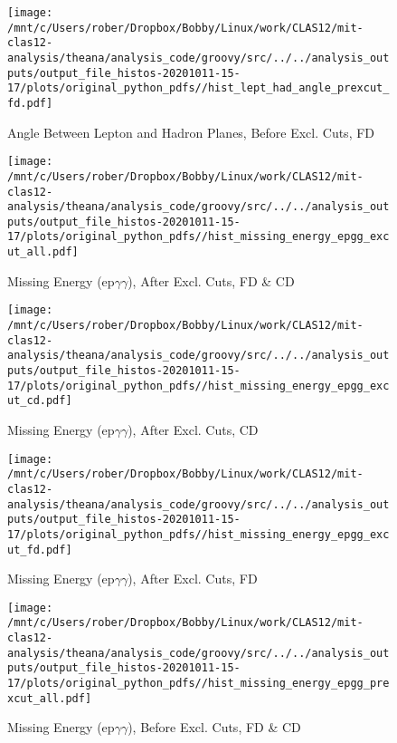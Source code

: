\documentclass{article}
\begin{document}
\begin{landscape}
\begin{figure}[h]
        \texttt{[image: /mnt/c/Users/rober/Dropbox/Bobby/Linux/work/CLAS12/mit-clas12-analysis/theana/analysis\_code/groovy/src/../../analysis\_outputs/output\_file\_histos-20201011-15-17/plots/original\_python\_pdfs//hist\_lept\_had\_angle\_prexcut\_fd.pdf]}
        \captionsetup{textformat=empty,labelformat=blank}
        \caption{Angle Between Lepton and Hadron Planes, Before Excl. Cuts, FD}
    \end{figure}
    \clearpage
    
    \begin{figure}[h]
        \centering

        \texttt{[image: /mnt/c/Users/rober/Dropbox/Bobby/Linux/work/CLAS12/mit-clas12-analysis/theana/analysis\_code/groovy/src/../../analysis\_outputs/output\_file\_histos-20201011-15-17/plots/original\_python\_pdfs//hist\_missing\_energy\_epgg\_excut\_all.pdf]}
        \captionsetup{textformat=empty,labelformat=blank}
        \caption{Missing Energy (ep$\gamma$$\gamma$), After Excl. Cuts, FD \& CD}
    \end{figure}
    \clearpage
    
    \begin{figure}[h]
        \centering

        \texttt{[image: /mnt/c/Users/rober/Dropbox/Bobby/Linux/work/CLAS12/mit-clas12-analysis/theana/analysis\_code/groovy/src/../../analysis\_outputs/output\_file\_histos-20201011-15-17/plots/original\_python\_pdfs//hist\_missing\_energy\_epgg\_excut\_cd.pdf]}
        \captionsetup{textformat=empty,labelformat=blank}
        \caption{Missing Energy (ep$\gamma$$\gamma$), After Excl. Cuts, CD}
    \end{figure}
    \clearpage
    
    \begin{figure}[h]
        \centering

        \texttt{[image: /mnt/c/Users/rober/Dropbox/Bobby/Linux/work/CLAS12/mit-clas12-analysis/theana/analysis\_code/groovy/src/../../analysis\_outputs/output\_file\_histos-20201011-15-17/plots/original\_python\_pdfs//hist\_missing\_energy\_epgg\_excut\_fd.pdf]}
        \captionsetup{textformat=empty,labelformat=blank}
        \caption{Missing Energy (ep$\gamma$$\gamma$), After Excl. Cuts, FD}
    \end{figure}
    \clearpage
    
    \begin{figure}[h]
        \centering

        \texttt{[image: /mnt/c/Users/rober/Dropbox/Bobby/Linux/work/CLAS12/mit-clas12-analysis/theana/analysis\_code/groovy/src/../../analysis\_outputs/output\_file\_histos-20201011-15-17/plots/original\_python\_pdfs//hist\_missing\_energy\_epgg\_prexcut\_all.pdf]}
        \captionsetup{textformat=empty,labelformat=blank}
        \caption{Missing Energy (ep$\gamma$$\gamma$), Before Excl. Cuts, FD \& CD}
    \end{figure}
    \clearpage
    

\end{landscape}
\end{document}
